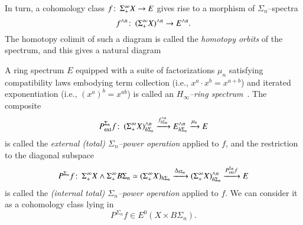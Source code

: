 \noindent In turn, a cohomology class $f\colon\thinspace \Sigma^\infty_+ X \to E$ gives rise to a morphism of $\Sigma_n$--spectra \[f^{\wedge n}\colon\thinspace (\Sigma^\infty_+ X)^{\wedge n} \to E^{\wedge n}.\]  The homotopy colimit of such a diagram is called the \textit{homotopy orbits} of the spectrum, and this gives a natural diagram
\begin{center}
\end{center}
A ring spectrum $E$ equipped with a suite of factorizations $\mu_n$ satisfying compatibility laws embodying term collection (i.e., $x^a \cdot x^b = x^{a+b}$) and iterated exponentiation (i.e., $(x^a)^b = x^{ab}$) is called an \textit{$H_\infty$--ring spectrum}~\cite[Definition I.3.1]{BMMS}.  The composite \[P^{\Sigma_n}_{\mathrm{ext}}f\colon\thinspace (\Sigma^\infty_+ X)^{\wedge n}_{h\Sigma_n} \xrightarrow{f^{\wedge n}_{h\Sigma_n}} E^{\wedge n}_{h\Sigma_n} \xrightarrow{\mu_n} E\] is called the \textit{external (total) $\Sigma_n$--power operation} applied to $f$, and the restriction to the diagonal subspace \[P^{\Sigma_n}f \colon\thinspace \Sigma^\infty_+ X \wedge \Sigma^\infty_+ B\Sigma_n \simeq (\Sigma^\infty_+ X)_{h\Sigma_n} \xrightarrow{\Delta_{h\Sigma_n}} (\Sigma^\infty_+ X)^{\wedge n}_{h\Sigma_n} \xrightarrow{P^{\Sigma_n}_{\mathrm{ext}}f} E\] is called the \textit{(internal total) $\Sigma_n$--power operation} applied to $f$.  We can consider it as a cohomology class lying in \[P^{\Sigma_n} f \in E^0(X \times B\Sigma_n).\]


